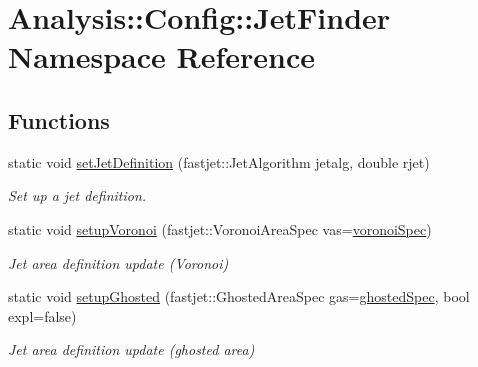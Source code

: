 \hypertarget{namespaceAnalysis_1_1Config_1_1JetFinder}{}\section{Analysis\+:\+:Config\+:\+:Jet\+Finder Namespace Reference}
\label{namespaceAnalysis_1_1Config_1_1JetFinder}
\subsection*{Functions}
\begin{DoxyCompactItemize}
\item 
static void \hyperlink{namespaceAnalysis_1_1Config_1_1JetFinder_aa2ea119b568bdc629fe0077b4c4fd87c}{set\+Jet\+Definition} (fastjet\+::\+Jet\+Algorithm jetalg, double rjet)
\begin{DoxyCompactList}\small\item\em Set up a jet definition. \end{DoxyCompactList}\item 
static void \hyperlink{namespaceAnalysis_1_1Config_1_1JetFinder_a3131a94663fdf8f592d4ded2d6be9393}{setup\+Voronoi} (fastjet\+::\+Voronoi\+Area\+Spec vas=\hyperlink{namespaceAnalysis_1_1Config_1_1JetFinder_a63a996b81ad4a7216c5652fb216c0ed2}{voronoi\+Spec})
\begin{DoxyCompactList}\small\item\em Jet area definition update (Voronoi) \end{DoxyCompactList}\item 
static void \hyperlink{namespaceAnalysis_1_1Config_1_1JetFinder_a6fa594e4a45f2951131d57cdf56d7bad}{setup\+Ghosted} (fastjet\+::\+Ghosted\+Area\+Spec gas=\hyperlink{namespaceAnalysis_1_1Config_1_1JetFinder_a69fd2afa3ea463941c31076604b1f430}{ghosted\+Spec}, bool expl=false)
\begin{DoxyCompactList}\small\item\em Jet area definition update (ghosted area) \end{DoxyCompactList}\end{DoxyCompactItemize}
